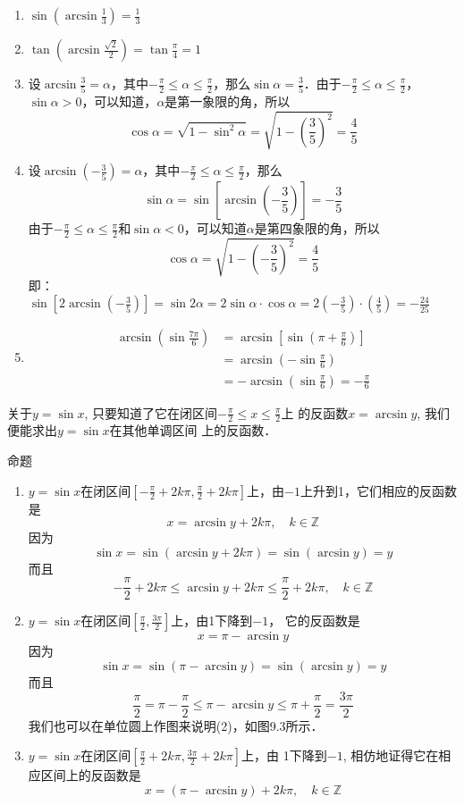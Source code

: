 \begin{solution}
\begin{enumerate}
    \item $\sin\left(\arcsin\frac{1}{3}\right)=\frac{1}{3}$
    \item $\tan\left(\arcsin\frac{\sqrt{2}}{2}\right)=\tan\frac{\pi}{4}=1$
    \item 设$\arcsin\frac{3}{5}=\alpha$，其中$-\frac{\pi}{2}\le\alpha\le\frac{\pi}{2}$，那么$\sin\alpha=\frac{3}{5}$．由于$-\frac{\pi}{2}\le\alpha\le\frac{\pi}{2}$，$\sin\alpha>0$，可以知道，$\alpha$是第一象限的角，所以
    $$\cos\alpha=\sqrt{1-\sin^2\alpha}=\sqrt{1-\left(\frac{3}{5}\right)^2}=\frac{4}{5}$$
    \item 设$\arcsin\left(-\frac{3}{5}\right)=\alpha$，其中$-\frac{\pi}{2}\le\alpha\le\frac{\pi}{2}$，那么
    \[\sin\alpha =\sin\left[\arcsin\left(-\frac{3}{5}\right)\right]=-\frac{3}{5}\]
由于$-\frac{\pi}{2}\le\alpha\le\frac{\pi}{2}$和$\sin\alpha<0$，可以知道$\alpha$是第四象限的角，所以
\[\cos\alpha=\sqrt{1-\left(-\frac{3}{5}\right)^2}=\frac{4}{5}\]
即：
$\sin\left[2\arcsin\left(-\frac{3}{5}\right)\right]=\sin2\alpha=2\sin\alpha\cdot \cos\alpha=2\left(-\frac{3}{5}\right)\cdot\left(\frac{4}{5}\right)=-\frac{24}{25}$
    \item \[\begin{split}
\arcsin\left(\sin\frac{7\pi}{6}\right)&=\arcsin\left[\sin\left(\pi+\frac{\pi}{6}\right)\right]\\
&=\arcsin\left(-\sin\frac{\pi}{6}\right)\\
&=-\arcsin\left(\sin\frac{\pi}{6}\right)=-\frac{\pi}{6}        
    \end{split}\]
\end{enumerate}
\end{solution}

关于$y=\sin x$, 只要知道了它在闭区间$-\frac{\pi}{2}\le x\le \frac{\pi}{2}$上
的反函数$x=\arcsin y$, 我们便能求出$y=\sin x$在其他单调区间
上的反函数．

\begin{blk}{命题}
\begin{enumerate}
    \item $y=\sin x$在闭区间$\left[-\frac{\pi}{2}+2k\pi,\frac{\pi}{2}+2k\pi\right]$上，由$-1$上升到1，它们相应的反函数是
\[x=\arcsin y+2k\pi,\quad k\in\mathbb{Z}\]
因为
\[\sin x= \sin(\arcsin y+ 2k\pi) = \sin(\arcsin y) = y\]
而且
\[-\frac{\pi}{2}+2k\pi\le \arcsin y+2k\pi \le \frac{\pi}{2}+2k\pi
,\quad k\in\mathbb{Z}\]
    
\item $y=\sin x$在闭区间$\left[\frac{\pi}{2},\frac{3\pi}{2}\right]$上，由1下降到$-1$，
它的反函数是
\[x=\pi-\arcsin y\]
因为
\[\sin x=\sin(\pi- \arcsin y) = \sin(\arcsin y) = y\]
而且
\[\frac{\pi}{2}=\pi-\frac{\pi}{2} \le \pi-\arcsin y \le \pi+\frac{\pi}{2}=\frac{3\pi}{2}\]
我们也可以在单位圆上作图来说明(2)，如图9.3所示．

\item $y=\sin x$在闭区间$\left[\frac{\pi}{2}+2k\pi,\frac{3\pi}{2}+2k\pi\right]$上，由
1下降到$-1$, 相仿地证得它在相应区间上的反函数是
\[x=(\pi-\arcsin y)+2k\pi,\quad k\in\mathbb{Z} \]
\end{enumerate}
\end{blk}

